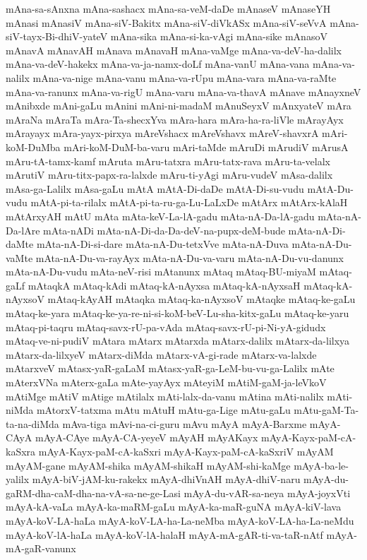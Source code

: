 {mAna-sa-sAnxna
mAna-sashacx
mAna-sa-veM-daDe
mAnaseV
mAnaseYH
mAnasi
mAnasiV
mAna-siV-Bakitx
mAna-siV-diVkASx
mAna-siV-seVvA
mAna-siV-tayx-Bi-dhiV-yateV
mAna-sika
mAna-si-ka-vAgi
mAna-sike
mAnasoV
mAnavA
mAnavAH
mAnava
mAnavaH
mAna-vaMge
mAna-va-deV-ha-dalilx
mAna-va-deV-hakekx
mAna-va-ja-namx-doLf
mAna-vanU
mAna-vana
mAna-va-nalilx
mAna-va-nige
mAna-vanu
mAna-va-rUpu
mAna-vara
mAna-va-raMte
mAna-va-ranunx
mAna-va-rigU
mAna-varu
mAna-va-thavA
mAnave
mAnayxneV
mAnibxde
mAni-gaLu
mAnini
mAni-ni-madaM
mAnuSeyxV
mAnxyateV
mAra
mAraNa
mAraTa
mAra-Ta-shecxYva
mAra-hara
mAra-ha-ra-liVle
mArayAyx
mArayayx
mAra-yayx-pirxya
mAreVshacx
mAreVshavx
mAreV-shavxrA
mAri-koM-DuMba
mAri-koM-DuM-ba-varu
mAri-taMde
mAruDi
mArudiV
mArusA
mAru-tA-tamx-kamf
mAruta
mAru-tatxra
mAru-tatx-rava
mAru-ta-velalx
mArutiV
mAru-titx-papx-ra-lalxde
mAru-ti-yAgi
mAru-vudeV
mAsa-dalilx
mAsa-ga-Lalilx
mAsa-gaLu
mAtA
mAtA-Di-daDe
mAtA-Di-su-vudu
mAtA-Du-vudu
mAtA-pi-ta-rilalx
mAtA-pi-ta-ru-ga-Lu-LaLxDe
mAtArx
mAtArx-kAlaH
mAtArxyAH
mAtU
mAta
mAta-keV-La-lA-gadu
mAta-nA-Da-lA-gadu
mAta-nA-Da-lAre
mAta-nADi
mAta-nA-Di-da-Da-deV-na-pupx-deM-bude
mAta-nA-Di-daMte
mAta-nA-Di-si-dare
mAta-nA-Du-tetxVve
mAta-nA-Duva
mAta-nA-Du-vaMte
mAta-nA-Du-va-rayAyx
mAta-nA-Du-va-varu
mAta-nA-Du-vu-danunx
mAta-nA-Du-vudu
mAta-neV-risi
mAtanunx
mAtaq
mAtaq-BU-miyaM
mAtaq-gaLf
mAtaqkA
mAtaq-kAdi
mAtaq-kA-nAyxsa
mAtaq-kA-nAyxsaH
mAtaq-kA-nAyxsoV
mAtaq-kAyAH
mAtaqka
mAtaq-ka-nAyxsoV
mAtaqke
mAtaq-ke-gaLu
mAtaq-ke-yara
mAtaq-ke-ya-re-ni-si-koM-beV-Lu-sha-kitx-gaLu
mAtaq-ke-yaru
mAtaq-pi-taqru
mAtaq-savx-rU-pa-vAda
mAtaq-savx-rU-pi-Ni-yA-gidudx
mAtaq-ve-ni-pudiV
mAtara
mAtarx
mAtarxda
mAtarx-dalilx
mAtarx-da-lilxya
mAtarx-da-lilxyeV
mAtarx-diMda
mAtarx-vA-gi-rade
mAtarx-va-lalxde
mAtarxveV
mAtasx-yaR-gaLaM
mAtasx-yaR-ga-LeM-bu-vu-ga-Lalilx
mAte
mAterxVNa
mAterx-gaLa
mAte-yayAyx
mAteyiM
mAtiM-gaM-ja-leVkoV
mAtiMge
mAtiV
mAtige
mAtilalx
mAti-lalx-da-vanu
mAtina
mAti-nalilx
mAti-niMda
mAtorxV-tatxma
mAtu
mAtuH
mAtu-ga-Lige
mAtu-gaLu
mAtu-gaM-Ta-ta-na-diMda
mAva-tiga
mAvi-na-ci-guru
mAvu
mAyA
mAyA-Barxme
mAyA-CAyA
mAyA-CAye
mAyA-CA-yeyeV
mAyAH
mAyAKayx
mAyA-Kayx-paM-cA-kaSxra
mAyA-Kayx-paM-cA-kaSxri
mAyA-Kayx-paM-cA-kaSxriV
mAyAM
mAyAM-gane
mAyAM-shika
mAyAM-shikaH
mAyAM-shi-kaMge
mAyA-ba-le-yalilx
mAyA-biV-jAM-ku-rakekx
mAyA-dhiVnAH
mAyA-dhiV-naru
mAyA-du-gaRM-dha-caM-dha-na-vA-sa-ne-ge-Lasi
mAyA-du-vAR-sa-neya
mAyA-joyxVti
mAyA-kA-vaLa
mAyA-ka-maRM-gaLu
mAyA-ka-maR-guNA
mAyA-kiV-lava
mAyA-koV-LA-haLa
mAyA-koV-LA-ha-La-neMba
mAyA-koV-LA-ha-La-neMdu
mAyA-koV-lA-haLa
mAyA-koV-lA-halaH
mAyA-mA-gAR-ti-va-taR-nAtf
mAyA-mA-gaR-vanunx
}
